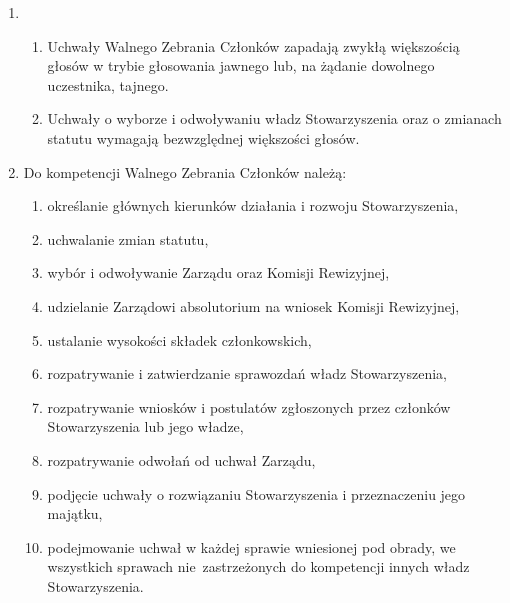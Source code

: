 \documentclass[chapterprefix,notitlepage]{article}
\begin{document}
\begin{enumerate}
	\item \begin{enumerate}
		\item Uchwały Walnego Zebrania Członków zapadają zwykłą większością głosów w trybie głosowania jawnego lub, na żądanie dowolnego uczestnika, tajnego.
		\item Uchwały o wyborze i odwoływaniu władz Stowarzyszenia oraz o zmianach statutu wymagają bezwzględnej większości głosów.
	\end{enumerate}
	
	\item Do kompetencji Walnego Zebrania Członków należą:
	\begin{enumerate}[1)]
	\item określanie głównych kierunków działania i rozwoju Stowarzyszenia,
	\item uchwalanie zmian statutu,
	\item wybór i odwoływanie Zarządu oraz Komisji Rewizyjnej,
	\item udzielanie Zarządowi absolutorium na wniosek Komisji Rewizyjnej,
	\item ustalanie wysokości składek członkowskich,
	\item rozpatrywanie i zatwierdzanie sprawozdań władz Stowarzyszenia,
	\item rozpatrywanie wniosków i postulatów zgłoszonych przez członków Stowarzyszenia lub jego władze,
	\item rozpatrywanie odwołań od uchwał Zarządu,
	\item podjęcie uchwały o rozwiązaniu Stowarzyszenia i przeznaczeniu jego majątku,
	\item podejmowanie uchwał w każdej sprawie wniesionej pod obrady, we wszystkich sprawach nie~zastrzeżonych do kompetencji innych władz Stowarzyszenia.
	\end{enumerate}
	

\end{enumerate}
\end{document}
